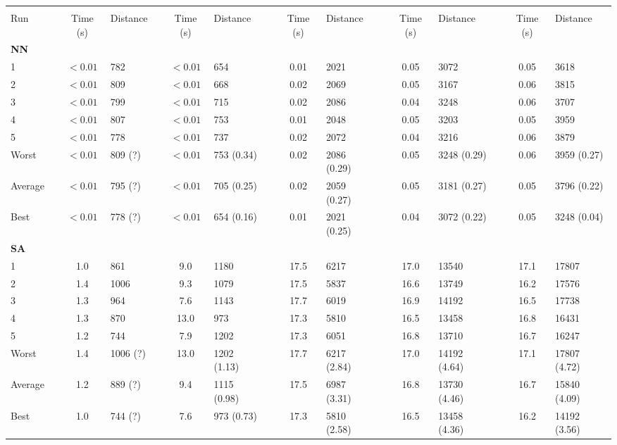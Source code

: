 \begin{sidewaystable}[hbpt]\centering
\footnotesize{
\begin{tabular} {l l S  l l S l l S l l S l l S l}
\toprule
&&  &&  &&   & & &&  \\          
Run & & {Time (s)} & Distance & & {Time (s)} & Distance && {Time (s)} & Distance && {Time (s)} & Distance && {Time (s)} & Distance \\ \midrule\addlinespace
\textbf{NN}\\
1   &&  {$< 0.01$} & 782 && {$< 0.01$} & 654  && 0.01 & 2021  && 0.05& 3072 && 0.05 & 3618 \\
2   &&  {$< 0.01$} & 809 && {$< 0.01$} & 668  && 0.02 & 2069 && 0.05 & 3167 && 0.06 & 3815   \\
3   &&  {$< 0.01$} & 799 && {$< 0.01$} & 715 &&  0.02 & 2086 && 0.04 & 3248 && 0.06& 3707    \\
4   &&  {$< 0.01$} & 807 && {$< 0.01$}& 753  && 0.01 & 2048 && 0.05 & 3203 && 0.05& 3959 \\
5   &&  {$< 0.01$} & 778 && {$< 0.01$}  & 737  && 0.02 & 2072 && 0.04 & 3216 && 0.06 & 3879  \\ \addlinespace
Worst  &&  {$< 0.01$} & 809 (?) && {$< 0.01$} & 753 (0.34) && 0.02  & 2086 (0.29) &&  0.05  & 3248 (0.29) && 0.06  & 3959 (0.27)  \\
Average&&  {$< 0.01$} & 795 (?) && {$< 0.01$} & 705 (0.25) &&  0.02  &  2059 (0.27) &&  0.05  & 3181 (0.27) && 0.05  & 3796 (0.22)    \\
Best   && {$< 0.01$} & 778 (?) && {$< 0.01$} & 654 (0.16)  &&  0.01  &  2021 (0.25)&&  0.04 & 3072 (0.22) && 0.05  &  3248 (0.04)   
\\\midrule\addlinespace\addlinespace
\textbf{SA}\\
1   &&  1.0 & 861 && 9.0 & 1180  && 17.5 & 6217  && 17.0 & 13540 && 17.1 & 17807 \\
2   &&  1.4 & 1006 && 9.3 & 1079  && 17.5 & 5837 && 16.6 & 13749 && 16.2 & 17576   \\
3   &&  1.3 & 964 &&  7.6 & 1143 && 17.7 & 6019 && 16.9 & 14192 && 16.5& 17738    \\
4   &&  1.3 & 870 && 13.0 &  973 && 17.3 & 5810 && 16.5 & 13458 && 16.8& 16431 \\
5   &&  1.2 & 744 && 7.9  & 1202  && 17.3 & 6051 && 16.8 & 13710 && 16.7 & 16247  \\ \addlinespace
Worst  &&  1.4 &  1006 (?) &&  13.0&  1202 (1.13) && 17.7 & 6217 (2.84) &&  17.0  & 14192 (4.64) && 17.1   &  17807 (4.72)  \\
Average&&   1.2 &  889 (?) && 9.4 & 1115 (0.98) &&  17.5  &   6987 (3.31) && 16.8   & 13730 (4.46) && 16.7 &  15840 (4.09)    \\
Best   &&  1.0 &  744 (?) && 7.6&  973 (0.73)  &&  17.3  &  5810 (2.58)&&  16.5 &  13458 (4.36) && 16.2 &  14192 (3.56)   


\end{tabular}}
\end{sidewaystable}
